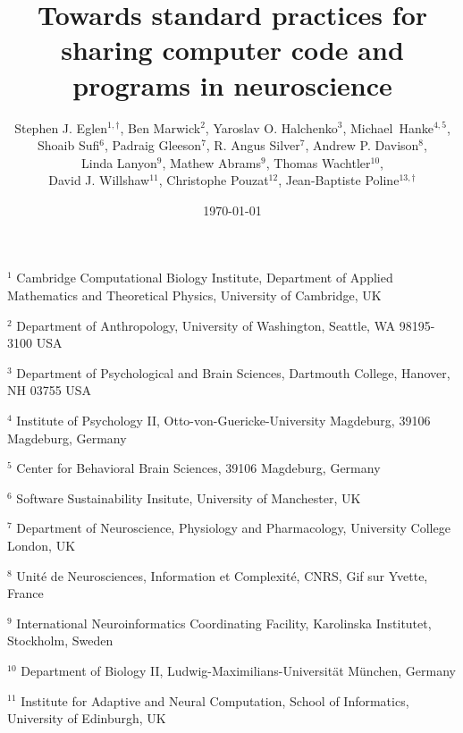 \documentclass[11pt]{article}
\begin{document}
\onehalfspacing

\title{Towards standard practices for sharing computer code and programs in neuroscience}

\author{Stephen J. Eglen$^{1,\dagger}$, Ben Marwick${^2}$, Yaroslav
  O. Halchenko${^3}$, Michael~Hanke${^{4,5}}$,
  \\
  Shoaib Sufi$^6$,
  Padraig Gleeson$^7$, R. Angus Silver$^7$,
  Andrew P. Davison$^8$,
  \\
  Linda Lanyon$^9$,
  Mathew Abrams$^9$,
  Thomas Wachtler$^{10}$,
  \\
  David J. Willshaw$^{11}$,
  Christophe Pouzat$^{12}$,
  Jean-Baptiste Poline$^{13,\dagger}$}
\date{\today}
\maketitle

\noindent $^{1}$ 
Cambridge Computational Biology Institute,
Department of Applied Mathematics and Theoretical Physics,
University of Cambridge, UK

\noindent $^{2}$ 
Department of Anthropology,
University of Washington,
Seattle, WA 98195-3100 USA 

\noindent $^{3}$
Department of Psychological and Brain Sciences,
Dartmouth College,
Hanover, NH 03755 USA

\noindent $^{4}$
Institute of Psychology II, Otto-von-Guericke-University Magdeburg, 39106 Magdeburg, Germany

\noindent $^{5}$
Center for Behavioral Brain Sciences, 39106 Magdeburg, Germany

\noindent $^{6}$
Software Sustainability Insitute, University of Manchester, UK

\noindent $^{7}$
Department of Neuroscience, Physiology and Pharmacology, 
University College London, UK


\noindent $^{8}$
Unit\'{e} de Neurosciences, Information et Complexit\'{e}, CNRS, Gif sur Yvette, France


\noindent $^{9}$
International Neuroinformatics Coordinating Facility, 
Karolinska Institutet, Stockholm, Sweden

\noindent $^{10}$
Department of Biology II, Ludwig-Maximilians-Universit\"{a}t
M\"{u}nchen, Germany

\noindent $^{11}$
Institute for Adaptive and Neural Computation, 
School of Informatics, University of Edinburgh, UK
\end{document}
